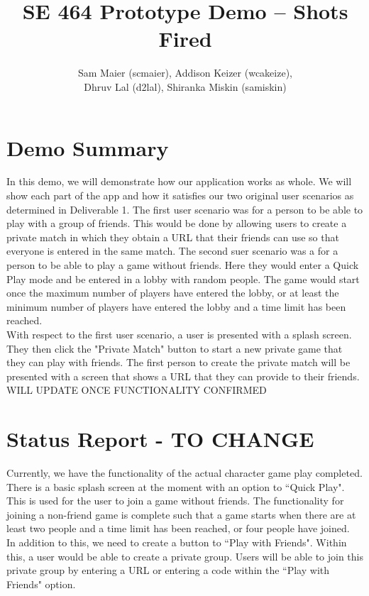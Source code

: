 \documentclass[11pt, oneside]{article}   	%
\title{SE 464 Prototype Demo -- Shots Fired}
\author{Sam Maier (scmaier), Addison Keizer (wcakeize), \\Dhruv Lal (d2lal), Shiranka Miskin (samiskin)}
\begin{document}
\maketitle


\clearpage

\section{Demo Summary}
\hspace*{5mm}
In this demo, we will demonstrate how our application works as whole. We will show
each part of the app and how it satisfies our two original user scenarios as
determined in Deliverable 1. The first user scenario was for a person to be able
to play with a group of friends. This would be done by allowing users to create
a private match in which they obtain a URL that their friends can use so that
everyone is entered in the same match. The second suer scenario was a for a person
to be able to play a game without friends. Here they would enter a Quick Play mode
and be entered in a lobby with random people. The game would start once the maximum
number of players have entered the lobby, or at least the minimum number of players
have entered the lobby and a time limit has been reached.\\

With respect to the first user scenario, a user is presented with a splash screen.
They then click the "Private Match" button to start a new private game that they
can play with friends. The first person to create the private match will be presented
with a screen that shows a URL that they can provide to their friends.
WILL UPDATE ONCE FUNCTIONALITY CONFIRMED


\section{Status Report - TO CHANGE}
\hspace*{5mm}
Currently, we have the functionality of the actual character game play completed. There
is a basic splash screen at the moment with an option to ``Quick Play". This is
used for the user to join a game without friends. The functionality for joining
a non-friend game is complete such that a game starts when there are at least
two people and a time limit has been reached, or four people have joined.\\

In addition to this, we need to create a button to ``Play with Friends". Within
this, a user would be able to create a private group. Users will be able to
join this private group by entering a URL or entering a code within the ``Play
with Friends" option.\\
\end{document}
